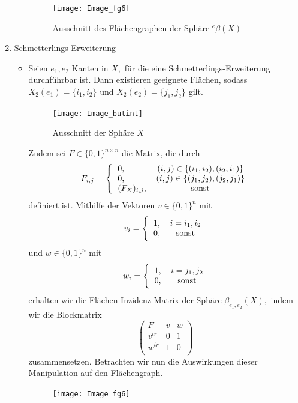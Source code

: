 \documentclass[12pt,titlepage,twoside,cleardoublepage]{article}
\theoremstyle{nummermitklammern}
\numberwithin{equation}{section}
\begin{document}
\begin{enumerate}
\begin{itemize}
\begin{figure}[H]
\begin{center}
\texttt{[image: Image\_fg6]}
\end{center}
\caption{Ausschnitt des Flächengraphen der Sphäre ${}^e\beta(X)$}
\end{figure}
\end{itemize}
\item Schmetterlings-Erweiterung
\begin{itemize}
\item Seien $e_1,e_2$ Kanten in $X,$ für die eine Schmetterlings-Erweiterung durchführbar ist. Dann existieren geeignete Flächen, sodass $X_2(e_1)=\{i_1,i_2\}$ und $X_2(e_2)=\{j_1,j_2\}$ gilt. 
\begin{figure}[H]
\begin{center}
\texttt{[image: Image\_butint]}
\end{center}
\caption{Ausschnitt der Sphäre $X$}
\end{figure}
Zudem sei $F\in \{0,1\}^{n\times n} $ die Matrix, die durch   
\[
F_{i,j}=
\Biggl{\{\begin{tabular}[l]{lcr}
0,&\textcolor{black}{$(i,j)\in \{(i_1,i_2),(i_2,i_1)\}$} \\
0,&\textcolor{black}{$(i,j)\in \{(j_1,j_2),(j_2,j_1)\}$} \\
$(F_{X})_{i,j}$,& sonst\\
\end{tabular}}
\]
definiert ist. Mithilfe der Vektoren $v\in \{0,1\}^n $ mit 
\[
v_{i}=
\Biggl{\{\begin{tabular}[l]{lcr}
1,& $i=i_1,i_2$\\
0,& sonst\\
\end{tabular}}
\]
und $w\in \{0,1\}^n $ mit 
\[
w_{i}=
\Biggl{\{\begin{tabular}[l]{lcr}
1,& $i=j_1,j_2$\\
0,& sonst\\ 
\end{tabular}}
\]
erhalten wir die Flächen-Inzidenz-Matrix der Sphäre $\beta_{e_1,e_2}(X)
,$ indem wir die Blockmatrix 
\[
\left(
\begin{array}{c|cc} 
  F & v& w \\ 
  \hline 
  v^{tr}& 0 &1 \\
  w^{tr} &1 &0  \\
\end{array} 
\right)
\]
zusammensetzen. Betrachten wir nun die Auswirkungen dieser Manipulation auf den Flächengraph. 
\begin{figure}[H]
\begin{center}
\texttt{[image: Image\_fg6]}

\end{center}
\end{figure}
\end{itemize}
\end{enumerate}
\end{document}
